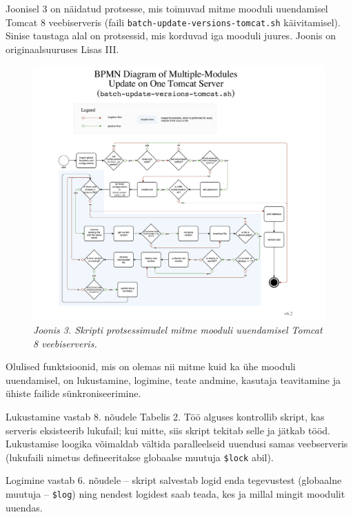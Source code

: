 \documentclass[12pt]{article}
\newcommand{\code}[1]{\texttt{#1}}
\begin{document}
   Joonisel 3 on näidatud protsesse, mis toimuvad mitme mooduli uuendamisel Tomcat 8 veebiserveris (faili \code{batch-update-versions-tomcat.sh} käivitamisel). Sinise taustaga alal on protsessid, mis korduvad iga mooduli juures. Joonis on originaalsuuruses Lisas III.
   
   \begin{figure}[H]
     \begin{center}
       \includegraphics[width=\textwidth]{diagrams/BPMN-diagram-multiple-module-update-tomcat.png}
       \caption*{\textit{Joonis 3. Skripti protsessimudel mitme mooduli uuendamisel Tomcat 8 veebiserveris.}}
     \end{center}
   \end{figure}
   
   \newpage
   
   Olulised funktsioonid, mis on olemas nii mitme kuid ka ühe mooduli uuendamisel, on lukustamine, logimine, teate andmine, kasutaja teavitamine ja ühiste failide sünkroniseerimine.
   
   Lukustamine vastab 8. nõudele Tabelis 2. Töö alguses kontrollib skript, kas serveris eksisteerib lukufail; kui mitte, siis skript tekitab selle ja jätkab tööd. Lukustamise loogika võimaldab vältida paralleelseid uuendusi samas veebserveris (lukufaili nimetus defineeritakse globaalse muutuja \code{\$lock} abil).
   
   Logimine vastab 6. nõudele \--- skript salvestab logid enda tegevustest (globaalne muutuja \--- \code{\$log}) ning nendest logidest saab teada, kes ja millal mingit moodulit uuendas.
   
\end{document}
